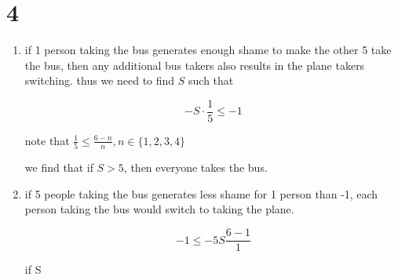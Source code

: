 \documentclass{article}
\begin{document}
\newpage
\section{4}

\begin{enumerate}
    \item if 1 person taking the bus generates enough shame to make the other 5 take the bus, then any additional bus takers also results in the plane takers switching. thus we need to find \(S\) such that
    
    \begin{equation}
        -S\cdot\frac{1}{5}\leq -1
    \end{equation}
    
    note that \(\frac{1}{5}\leq \frac{6-n}{n},n\in\{1,2,3,4\}\)
    
    we find that if \(S>5\), then everyone takes the bus. 
    \item if 5 people taking the bus generates less shame for 1 person than -1, each person taking the bus would switch to taking the plane.
    
    \begin{equation}
        -1\leq-5S\frac{6-1}{1}
    \end{equation}

    if S



\end{enumerate}
\end{document}
